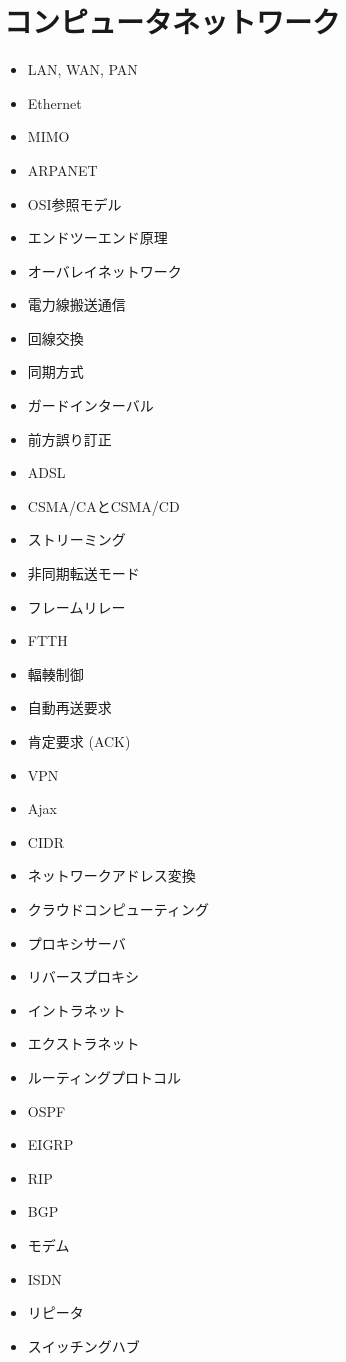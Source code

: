 \documentclass[a4j, titlepage, 11pt]{jsarticle}
\begin{document}
\clearpage
\section{コンピュータネットワーク}
\begin{multicols}{3}
\begin{itemize}
	\item LAN, WAN, PAN
	\item Ethernet
	\item MIMO
	\item ARPANET
	\item OSI参照モデル
	\item エンドツーエンド原理
	\item オーバレイネットワーク
	\item 電力線搬送通信
	\item 回線交換
	\item 同期方式
	\item ガードインターバル
	\item 前方誤り訂正
	\item ADSL
	\item CSMA/CAとCSMA/CD
	\item ストリーミング
	\item 非同期転送モード
	\item フレームリレー
	\item FTTH
	\item 輻輳制御
	\item 自動再送要求
	\item 肯定要求 (ACK)
	\item VPN
	\item Ajax
	\item CIDR
	\item ネットワークアドレス変換
	\item クラウドコンピューティング
	\item プロキシサーバ
	\item リバースプロキシ
	\item イントラネット
	\item エクストラネット
	\item ルーティングプロトコル
	\item OSPF
	\item EIGRP
	\item RIP
	\item BGP
	\item モデム
	\item ISDN
	\item リピータ
	\item スイッチングハブ

\end{itemize}
\end{multicols}
\end{document}
